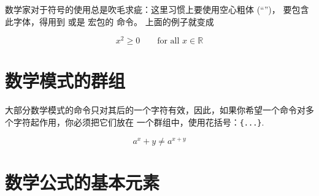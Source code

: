 数学家对于符号的使用总是吹毛求疵：这里习惯上要使用空心粗体 (``'')，
要包含此字体，得用到  或是  宏包的  命令。\ifx\mathbb\undefined\else
上面的例子就变成

\begin{example}
\begin{displaymath}
x^{2} \geq 0\qquad
\textrm{for all }x\in\mathbb{R}
\end{displaymath}
\end{example}
\fi

\section{数学模式的群组}

大部分数学模式的命令只对其后的一个字符有效，因此，如果你希望一个命令对多个字符起作用，你必须把它们放在
一个群组中，使用花括号：\verb|{...}|.
\begin{example}
\begin{equation}
a^x+y \neq a^{x+y}
\end{equation}
\end{example}

\section{数学公式的基本元素}
%

